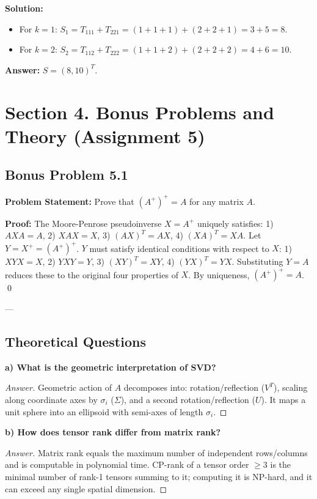 \documentclass[11pt, a4paper]{article}
\begin{document}
\textbf{Solution:}
\begin{itemize}
\item For $k = 1$: $S_1 = T_{111} + T_{221} = (1+1+1) + (2+2+1) = 3 + 5 = 8$.
\item For $k = 2$: $S_2 = T_{112} + T_{222} = (1+1+2) + (2+2+2) = 4 + 6 = 10$.
\end{itemize}

\textbf{Answer:} $S = (8, 10)^T$.

\newpage

\section{Section 4. Bonus Problems and Theory (Assignment 5)}

\subsection*{Bonus Problem 5.1}
\textbf{Problem Statement:} Prove that $(A^+)^+ = A$ for any matrix $A$.

\textbf{Proof:}
The Moore-Penrose pseudoinverse $X = A^+$ uniquely satisfies:
1) $AXA = A$, 2) $XAX = X$, 3) $(AX)^T = AX$, 4) $(XA)^T = XA$.
Let $Y = X^+ = (A^+)^+$. $Y$ must satisfy identical conditions with respect to $X$:
1) $XYX = X$, 2) $YXY = Y$, 3) $(XY)^T = XY$, 4) $(YX)^T = YX$.
Substituting $Y = A$ reduces these to the original four properties of $X$. By uniqueness, $(A^+)^+ = A$. \qed

---

\subsection*{Theoretical Questions}

\textbf{a) What is the geometric interpretation of SVD?}
\begin{proof}[Answer]
Geometric action of $A$ decomposes into: rotation/reflection ($V^T$), scaling along coordinate axes by $\sigma_i$ ($\Sigma$), and a second rotation/reflection ($U$). It maps a unit sphere into an ellipsoid with semi-axes of length $\sigma_i$.
\end{proof}

\textbf{b) How does tensor rank differ from matrix rank?}
\begin{proof}[Answer]
Matrix rank equals the maximum number of independent rows/columns and is computable in polynomial time. CP-rank of a tensor order $\ge 3$ is the minimal number of rank-1 tensors summing to it; computing it is NP-hard, and it can exceed any single spatial dimension.
\end{proof}
\end{document}

